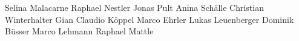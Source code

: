 Selina Malacarne
Raphael Nestler
Jonas Pult
Anina Schälle
Christian Winterhalter
Gian Claudio Köppel
Marco Ehrler
Lukas Leuenberger
Dominik Büsser
Marco Lehmann
Raphael Mattle